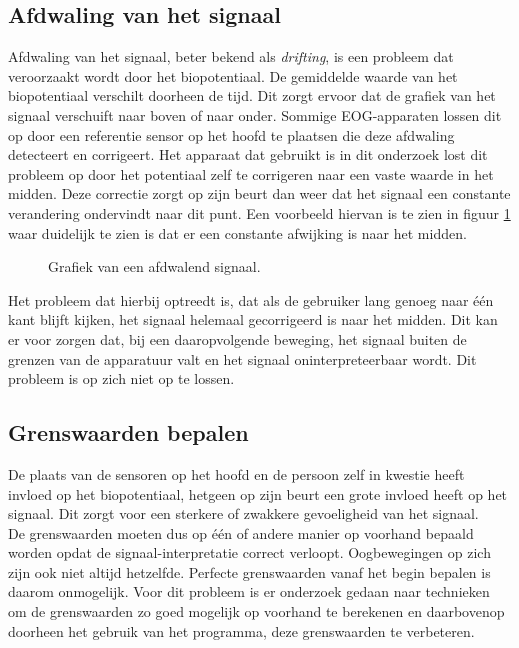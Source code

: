 \documentclass{article}
\newcommand{\figwidth}{0.82\linewidth}
\begin{document}
\subsection{Afdwaling van het signaal}
Afdwaling van het signaal, beter bekend als \textit{drifting}, is een probleem dat veroorzaakt wordt door het biopotentiaal. De gemiddelde waarde van het biopotentiaal verschilt doorheen de tijd. Dit zorgt ervoor dat de grafiek van het signaal verschuift naar boven of naar onder. Sommige EOG-apparaten lossen dit op door een referentie sensor op het hoofd te plaatsen die deze afdwaling detecteert en corrigeert. Het apparaat dat gebruikt is in dit onderzoek lost dit probleem op door het potentiaal zelf te corrigeren naar een vaste waarde in het midden. Deze correctie zorgt op zijn beurt dan weer dat het signaal een constante verandering ondervindt naar dit punt. Een voorbeeld hiervan is te zien in figuur \ref{fig:drifting} waar duidelijk te zien is dat er een constante afwijking is naar het midden.\\
\begin{figure}[H]
	\centering
	\caption{Grafiek van een afdwalend signaal.}
	\label{fig:drifting}
\end{figure}
Het probleem dat hierbij optreedt is, dat als de gebruiker lang genoeg naar \'e\'en kant blijft kijken, het signaal helemaal gecorrigeerd is naar het midden. Dit kan er voor zorgen dat, bij een daaropvolgende beweging, het signaal buiten de grenzen van de apparatuur valt en het signaal oninterpreteerbaar wordt. Dit probleem is op zich niet op te lossen.

\subsection{Grenswaarden bepalen}
De plaats van de sensoren op het hoofd en de persoon zelf in kwestie heeft invloed op het biopotentiaal, hetgeen op zijn beurt een grote invloed heeft op het signaal. Dit zorgt voor een sterkere of zwakkere gevoeligheid van het signaal.\\
De grenswaarden moeten dus op \'e\'en of andere manier op voorhand bepaald worden opdat de signaal-interpretatie correct verloopt. Oogbewegingen op zich zijn ook niet altijd hetzelfde. Perfecte grenswaarden vanaf het begin bepalen is daarom onmogelijk. Voor dit probleem is er onderzoek gedaan naar technieken om de grenswaarden zo goed mogelijk op voorhand te berekenen en daarbovenop doorheen het gebruik van het programma, deze grenswaarden te verbeteren.
\end{document}
